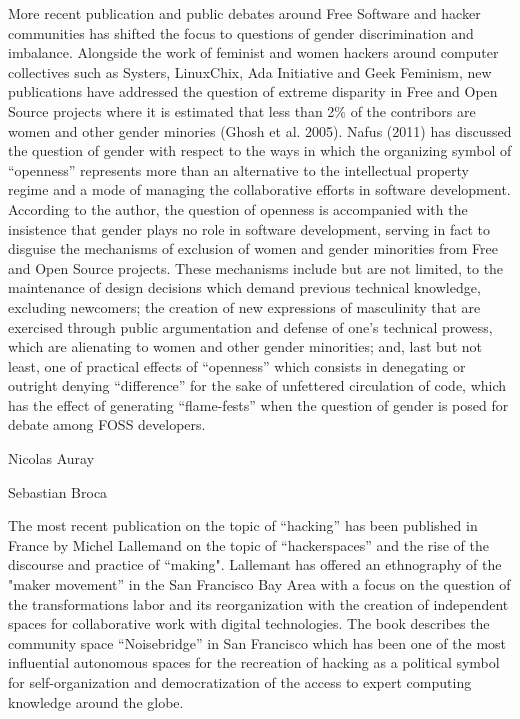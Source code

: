\documentclass[10pt,letter,oneside]{scrartcl}
\begin{document}
More recent publication and public debates around Free Software and hacker 
communities has shifted the focus to questions of gender discrimination and imbalance.  Alongside the work of feminist and women hackers around computer collectives such 
as Systers, LinuxChix, Ada Initiative and Geek Feminism, new publications have addressed the  question of extreme disparity in Free and Open Source projects where it is estimated that less than 2\% of the contribors are women and other gender minories (Ghosh et al. 
2005).  Nafus (2011) has discussed the question of gender with respect to the
ways in which the organizing symbol of ``openness'' represents more than an alternative
to the intellectual property regime and a mode of managing the collaborative efforts
in software development. According to the author, the question of openness is accompanied
with the insistence that gender plays no role in software development, serving in fact
to disguise the mechanisms of exclusion of women and gender minorities from Free and 
Open Source projects.  These mechanisms include but are not limited, to the maintenance 
of design decisions which demand previous technical knowledge, excluding newcomers; the
creation of new expressions of masculinity that are exercised through public argumentation
and defense of one's technical prowess, which are alienating to women and other gender
minorities; and, last but not least, one of practical effects of ``openness'' which 
consists in denegating or outright denying ``difference'' for the sake of unfettered circulation of code, which has the effect of generating ``flame-fests'' when the
question of gender is posed for debate among FOSS developers. 

Nicolas Auray    %

Sebastian Broca   %

The most recent publication on the topic of ``hacking'' has been published in
France by Michel Lallemand on the topic of ``hackerspaces'' and the rise of the
discourse and practice of ``making".  Lallemant has offered an ethnography of the
"maker movement'' in the San Francisco Bay Area with a focus on the question of
the transformations labor and its reorganization with the creation of
independent spaces for collaborative work with digital technologies. The book
describes the community space ``Noisebridge'' in San Francisco which has been
one of the most influential autonomous spaces for the recreation of hacking 
as a political symbol for self-organization and democratization of the access 
to expert computing knowledge around the globe.
\end{document}
